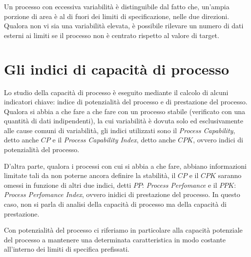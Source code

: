 Un processo con eccessiva variabilità è distinguibile dal fatto che, un'ampia porzione di area è al di fuori dei limiti di specificazione, nelle due direzioni.
Qualora non vi sia una variabilità elevata, è possibile rilevare un numero di dati esterni ai limiti se il processo non è centrato rispetto al valore di target. 
\cite{UniRoma}




\section{Gli indici di capacità di processo}
Lo studio della capacità di processo è eseguito mediante il calcolo di alcuni indicatori chiave: indice di potenzialità del processo e di prestazione del processo. 
Qualora si abbia a che fare a che fare con un processo stabile (verificato con una quantità di dati indipendenti), la cui variabilità è dovuta solo ed esclusivamente alle cause comuni di variabilità, gli indici utilizzati sono il \textit{Process Capability}, detto anche $CP$ e il \textit{Process Capability Index}, detto anche $CPK$, ovvero indici di potenzialità del processo. 


D'altra parte, qualora i processi con cui si abbia a che fare, abbiano informazioni limitate tali da non poterne ancora definire la stabilità, il $CP$ e il  $CPK$ saranno omessi in funzione di altri due indici, detti $PP$: \textit{Process Perfomance} e il $PPK$: \textit{Process Perfomance Index}, ovvero inidici di prestazione del processo.
In questo caso, non si parla di analisi della capacità di processo ma della capacità di prestazione.
\cite{Meetheskilles}


Con potenzialità del processo ci riferiamo in particolare alla capacità potenziale del processo a mantenere una determinata caratteristica in modo costante all'interno dei limiti di specifica prefissati.


